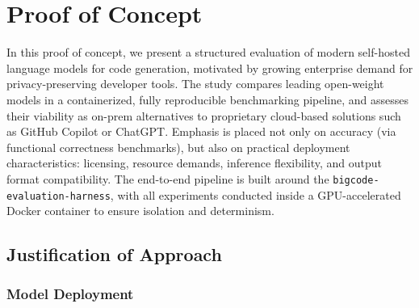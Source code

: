 \chapter{Proof of Concept}
\label{ch:proof-of-concept}

In this proof of concept, we present a structured evaluation of modern self-hosted language models for code generation, motivated by growing enterprise demand for privacy-preserving developer tools. The study compares leading open-weight models in a containerized, fully reproducible benchmarking pipeline, and assesses their viability as on-prem alternatives to proprietary cloud-based solutions such as GitHub Copilot or ChatGPT. Emphasis is placed not only on accuracy (via functional correctness benchmarks), but also on practical deployment characteristics: licensing, resource demands, inference flexibility, and output format compatibility. The end-to-end pipeline is built around the \texttt{bigcode-evaluation-harness}, with all experiments conducted inside a GPU-accelerated Docker container to ensure isolation and determinism. %

\section{Justification of Approach}
\label{ch:poc-justification}
\subsection{Model Deployment}
\label{subsection:model-deployment-justification}


